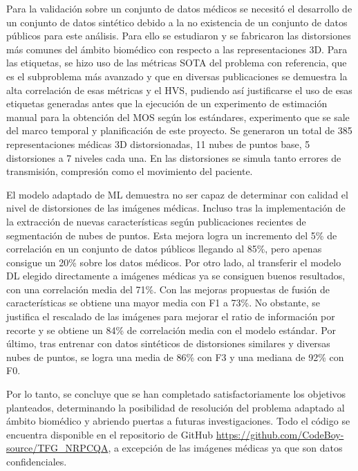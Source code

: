 Para la validación sobre un conjunto de datos médicos se necesitó el desarrollo 
de un conjunto de datos sintético debido a la no existencia de un conjunto de 
datos públicos para este análisis. Para ello se estudiaron y se fabricaron las distorsiones más 
comunes del ámbito biomédico con respecto a las representaciones 3D. Para las etiquetas, 
se hizo uso de las métricas SOTA del problema con referencia, que es el subproblema 
más avanzado y que en diversas publicaciones se demuestra la alta correlación 
de esas métricas y el HVS, pudiendo así justificarse el uso de esas 
etiquetas generadas antes que la ejecución de un experimento de estimación 
manual para la obtención del MOS según los estándares, experimento que se 
sale del marco temporal y planificación de este proyecto. Se generaron 
un total de 385 representaciones médicas 3D distorsionadas, 11 nubes de puntos 
base, 5 distorsiones a 7 niveles cada una. En las distorsiones se simula 
tanto errores de transmisión, compresión como el movimiento del paciente.

El modelo adaptado de ML demuestra no ser capaz de determinar con calidad 
el nivel de distorsiones de las imágenes médicas. Incluso tras la implementación 
de la extracción de nuevas características según publicaciones recientes 
de segmentación de nubes de puntos. Esta mejora logra un incremento del 5\% de correlación en un conjunto de datos públicos llegando al 85\%, pero apenas consigue un 20\% sobre los datos médicos. 
Por otro lado, al transferir el modelo DL elegido directamente a imágenes médicas ya se consiguen 
buenos resultados, con una correlación media del 71\%. Con las mejoras propuestas de 
fusión de características se obtiene una mayor media con F1 a 73\%. No obstante, 
se justifica el rescalado de las imágenes para mejorar el ratio de información 
por recorte y se obtiene un 84\% de correlación media con el modelo estándar. 
Por último, tras entrenar con datos sintéticos de distorsiones similares y 
diversas nubes de puntos, se logra una media de 86\% con F3 y una mediana de 92\% con F0.

Por lo tanto, se concluye que se han completado satisfactoriamente los objetivos 
planteados, determinando la posibilidad de resolución del problema adaptado 
al ámbito biomédico y abriendo puertas a futuras investigaciones. Todo el código
se encuentra disponible en el repositorio de GitHub \url{https://github.com/CodeBoy-source/TFG_NRPCQA},
a excepción de las imágenes médicas ya que son datos confidenciales.

